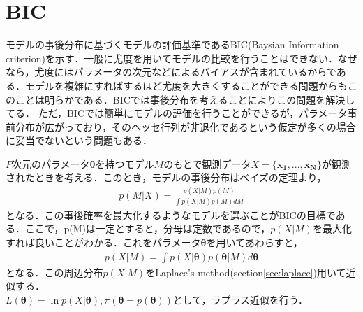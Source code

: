 %
%

\section{BIC}
\label{sec:bic}
モデルの事後分布に基づくモデルの評価基準であるBIC(Baysian Information criterion)を示す．一般に尤度を用いてモデルの比較を行うことはできない．なぜなら，尤度にはパラメータの次元などによるバイアスが含まれているからである\cite{konishi_kitagawa200409}．モデルを複雑にすればするほど尤度を大きくすることができる問題からもこのことは明らかである．BICでは事後分布を考えることによりこの問題を解決してる．
ただ，BICでは簡単にモデルの評価を行うことができるが，パラメータ事前分布が広がっており，そのヘッセ行列が非退化であるという仮定が多くの場合に妥当でないという問題もある\cite{Bishop201002}．

$P$次元のパラメータ$\bm{\theta}$を持つモデル$M$のもとで観測データ$X=\{\bm{x_1},..., \bm{x_N}\}$が観測されたときを考える．このとき，モデルの事後分布はベイズの定理より，
\begin{eqnarray}
  \label{eq:1}
  p(M|X) = \frac{p(X|M)p(M)}{\int p(X|M)p(M) dM}
\end{eqnarray}
となる．この事後確率を最大化するようなモデルを選ぶことがBICの目標である．ここで，p(M)は一定とすると，分母は定数であるので，$p(X|M)$を最大化すれば良いことがわかる．これをパラメータ$\bm{\theta}$を用いてあわらすと，
\begin{eqnarray}
  \label{eq:2}
  p(X|M) = \int p(X|\bm{\theta}) p(\bm{\theta}|M) d\bm{\theta}
\end{eqnarray}
となる．この周辺分布$p(X|M)$をLaplace's method(section\ref{sec:laplace})用いて近似する．
\\

$L(\bm{\theta}) = \ln p(X|\bm{\theta}), \pi(\bm{\theta} = p(\bm{\theta}))$として，ラプラス近似を行う．

